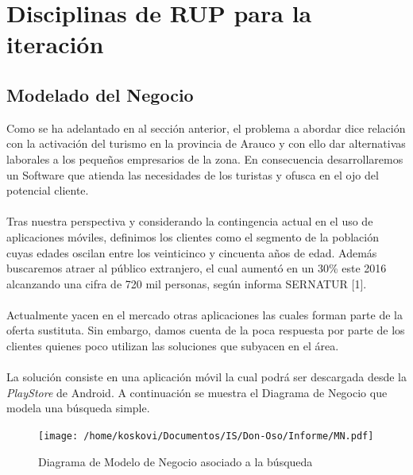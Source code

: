 \documentclass[12pt]{article}
\begin{document}
\section{Disciplinas de RUP para la iteración}
%
%
\subsection{Modelado del Negocio}
Como se ha adelantado en al sección anterior, el problema a abordar dice relación con la activación del turismo en la provincia de Arauco y con ello dar alternativas laborales a los pequeños empresarios de la zona. En consecuencia desarrollaremos un Software que atienda las necesidades de los turistas y ofusca  en el ojo del potencial cliente.\\\\Tras nuestra perspectiva y considerando la contingencia actual en el uso de aplicaciones móviles, definimos los clientes como el segmento de la población cuyas edades oscilan entre los veinticinco y cincuenta años de edad. Además buscaremos atraer al público extranjero, el cual aumentó en un 30\% este 2016 alcanzando una cifra de 720 mil personas, según informa SERNATUR [1].\\\\Actualmente yacen en el mercado otras aplicaciones las cuales forman parte de la oferta sustituta. Sin embargo, damos cuenta de la poca respuesta por parte de los clientes quienes poco utilizan las soluciones que subyacen en el área.\\\\La solución consiste en una aplicación móvil la cual podrá ser descargada desde la \emph{PlayStore} de Android. A continuación se muestra el Diagrama de Negocio que modela una búsqueda simple.
\begin{figure}[htp]
\begin{center}\centering
\texttt{[image: /home/koskovi/Documentos/IS/Don-Oso/Informe/MN.pdf]}
\caption{Diagrama de Modelo de Negocio asociado a la búsqueda}
\label{}\end{center}
\end{figure}
\end{document}
